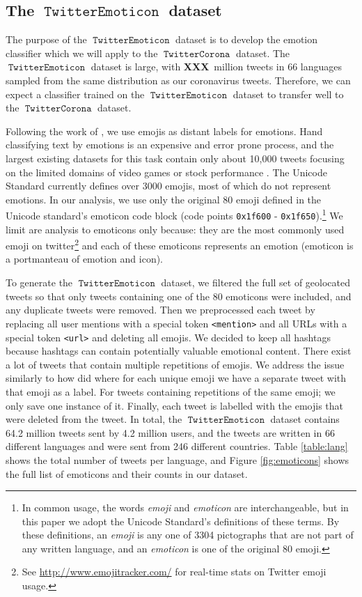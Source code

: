 \documentclass[11pt]{article}
\newcommand{\defn}[1]{\emph{{#1}}}
\newcommand{\XXX}{\textbf{XXX}~}
\DeclareMathOperator{\emoticon}{\texttt{TwitterEmoticon}}
\DeclareMathOperator{\corona}{\texttt{TwitterCorona}}
\begin{document}
\subsection {The $\emoticon$ dataset}

The purpose of the $\emoticon$ dataset is to develop the emotion classifier which we will apply to the $\corona$ dataset.
The $\emoticon$ dataset is large, with \XXX million tweets in 66 languages sampled from the same distribution as our coronavirus tweets.
Therefore, we can expect a classifier trained on the $\emoticon$ dataset to transfer well to the $\corona$ dataset.

Following the work of \citet{fixme1,fixme2,fixme3}, we use emojis as distant labels for emotions.
Hand classifying text by emotions is an expensive and error prone process,
and the largest existing datasets for this task contain only about 10,000 tweets focusing on the limited domains of video games \citep{fixme} or stock performance \citep{fixme}.
The Unicode Standard \citep{fixme} currently defines over 3000 emojis,
most of which do not represent emotions.
In our analysis, we use only the original 80 emoji defined in the Unicode standard's emoticon code block (code points \texttt{0x1f600} - \texttt{0x1f650}).\footnote{
    In common usage, the words \defn{emoji} and \defn{emoticon} are interchangeable,
    but in this paper we adopt the Unicode Standard's definitions of these terms.
    By these definitions, an \defn{emoji} is any one of 3304 pictographs that are not part of any written language,
    and an \defn{emoticon} is one of the original 80 emoji.
}
We limit are analysis to emoticons only because:
they are the most commonly used emoji on twitter\footnote{
    See \url{http://www.emojitracker.com/} for real-time stats on Twitter emoji usage.
}
and each of these emoticons represents an emotion (emoticon is a portmanteau of emotion and icon).

To generate the $\emoticon$ dataset, 
we filtered the full set of geolocated tweets so that only tweets containing one of the 80 emoticons were included,
and any duplicate tweets were removed.
Then we preprocessed each tweet by replacing all user mentions with a special token \texttt{<mention>} and all URLs with a special token \texttt{<url>} and deleting all emojis.
We decided to keep all hashtags because hashtags can contain potentially valuable emotional content.
There exist a lot of tweets that contain multiple repetitions of emojis.
We address the issue similarly to how \cite{100_million_tweets} did where for each unique emoji we have a separate tweet with that emoji as a label. 
For tweets containing repetitions of the same emoji; we only save one instance of it.
Finally, each tweet is labelled with the emojis that were deleted from the tweet.
In total, the $\emoticon$ dataset contains 64.2 million tweets sent by 4.2 million users,
and the tweets are written in 66 different languages and were sent from 246 different countries.
Table \ref{table:lang} shows the total number of tweets per language,
and Figure \ref{fig:emoticons} shows the full list of emoticons and their counts in our dataset. 
\end{document}
